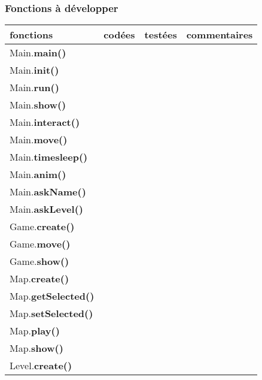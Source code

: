 \documentclass[a4paper]{article}
\begin{document}
            \subsubsection{Fonctions à développer}
            \begin{tabular}{|l|c|c|c|}
                \hline
                fonctions & codées & testées & commentaires \\
                \hline
                Main.\textbf{main()} & & & \\
                \hline
                Main.\textbf{init()} & & & \\
                \hline
                Main.\textbf{run()} & & & \\
                \hline
                Main.\textbf{show()} & & & \\
                \hline
                Main.\textbf{interact()} & & & \\
                \hline
                Main.\textbf{move()} & & & \\
                \hline
                Main.\textbf{timesleep()} & & & \\
                \hline
                Main.\textbf{anim()} & & & \\
                \hline
                Main.\textbf{askName()} & & & \\
                \hline
                Main.\textbf{askLevel()} & & & \\
                \hline
                \hline
                Game.\textbf{create()} & & & \\
                \hline
                Game.\textbf{move()} & & & \\
                \hline
                Game.\textbf{show()} & & & \\
                \hline
                \hline
                Map.\textbf{create()} & & & \\
                \hline
                Map.\textbf{getSelected()} & & & \\
                \hline
                Map.\textbf{setSelected()} & & & \\
                \hline
                Map.\textbf{play()} & & & \\
                \hline
                Map.\textbf{show()} & & & \\
                \hline
                \hline
                Level.\textbf{create()} & & & \\
                \hline

\end{tabular}
\end{document}

